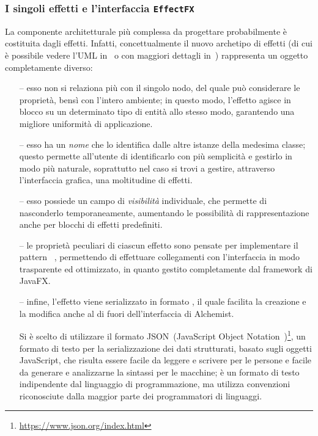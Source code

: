             \subsubsection{I singoli effetti e l'interfaccia \texttt{EffectFX}}\label{subsub:effectFX}
                La componente architetturale più complessa da progettare probabilmente è costituita dagli effetti.
                Infatti, concettualmente il nuovo archetipo di effetti (di cui è possibile vedere l'UML in~ o con maggiori dettagli in~) rappresenta un oggetto completamente diverso:

                \begin{itemize}
                    \item[--]\label{itm:eFXEnv} esso non si relaziona più con il singolo nodo, del quale può considerare le proprietà, bensì con l'intero ambiente; in questo modo, l'effetto agisce in blocco su un determinato tipo di entità allo stesso modo, garantendo una migliore uniformità di applicazione.

                    \item[--]\label{itm:eFXName} esso ha un \emph{nome} che lo identifica dalle altre istanze della medesima classe; questo permette all'utente di identificarlo con più semplicità e gestirlo in modo più naturale, soprattutto nel caso si trovi a gestire, attraverso l’interfaccia grafica, una moltitudine di effetti.

                    \item[--]\label{itm:eFXVis} esso possiede un campo di \emph{visibilità} individuale, che permette di nasconderlo temporaneamente, aumentando le possibilità di rappresentazione anche per blocchi di effetti predefiniti.

                    \item[--]\label{itm:eFXobservable} le proprietà peculiari di ciascun effetto sono pensate per implementare il pattern ~\cite{observer}, permettendo di effettuare collegamenti con l'interfaccia in modo trasparente ed ottimizzato, in quanto gestito completamente dal framework di JavaFX.

                    \item[--]\label{itm:eFXjson} infine, l'effetto viene serializzato in formato , il quale facilita la creazione e la modifica anche al di fuori dell'interfaccia di Alchemist.

                    Si è scelto di utilizzare il formato JSON~(JavaScript Object Notation~\cite{json})\footnote{\url{https://www.json.org/index.html}}, un formato di testo per la serializzazione dei dati strutturati, basato sugli oggetti JavaScript, che risulta essere facile da leggere e scrivere per le persone e facile da generare e analizzarne la sintassi per le macchine; è un formato di testo indipendente dal linguaggio di programmazione, ma utilizza convenzioni riconosciute dalla maggior parte dei programmatori di linguaggi.

                \end{itemize}

